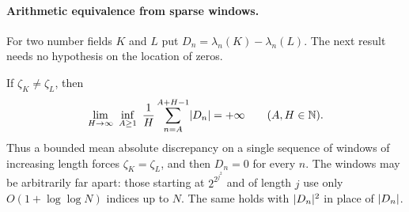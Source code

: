 \paragraph{Arithmetic equivalence from sparse windows.} For two number fields $K$ and $L$ put
$D_n=\lambda_n(K)-\lambda_n(L)$. The next result needs no hypothesis on the location of zeros.

\begin{theorem}\label{li:thm:rigidity}
If $\zeta_K\ne\zeta_L$, then
\[
 \lim_{H\to\infty}\ \inf_{A\ge1}\ \frac1H\sum_{n=A}^{A+H-1}\abs{D_n}=+\infty\qquad(A,H\in\N).
\]
Thus a bounded mean absolute discrepancy on a single sequence of windows of increasing length
forces $\zeta_K=\zeta_L$, and then $D_n=0$ for every $n$. The windows may be arbitrarily far
apart: those starting at $2^{2^{j^2}}$ and of length $j$ use only $O(1+\log\log N)$ indices up
to $N$. The same holds with $\lvert D_n\rvert^2$ in place of $\lvert D_n\rvert$.
\end{theorem}

